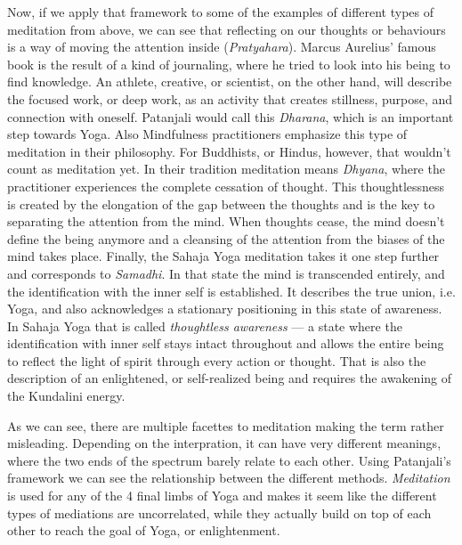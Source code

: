 \documentclass[12pt]{article}
\begin{document}
Now, if we apply that framework to some of the examples of different types of meditation from above, we can see that reflecting on our thoughts or behaviours is a way of moving the attention inside (\textit{Pratyahara}). Marcus Aurelius' famous book is the result of a kind of journaling, where he tried to look into his being to find knowledge.
An athlete, creative, or scientist, on the other hand, will describe the focused work, or deep work, as an activity that creates stillness, purpose, and connection with oneself.
Patanjali would call this \textit{Dharana}, which is an important step towards Yoga.
Also Mindfulness practitioners emphasize this type of meditation in their philosophy.
For Buddhists, or Hindus, however, that wouldn't count as meditation yet.
In their tradition meditation means \textit{Dhyana}, where the practitioner experiences the complete cessation of thought.
This thoughtlessness is created by the elongation of the gap between the thoughts and is the key to separating the attention from the mind.
When thoughts cease, the mind doesn't define the being anymore and a cleansing of the attention from the biases of the mind takes place.
Finally, the Sahaja Yoga meditation takes it one step further and corresponds to \textit{Samadhi}.
In that state the mind is transcended entirely, and the identification with the inner self is established.
It describes the true union, i.e. Yoga, and also acknowledges a stationary positioning in this state of awareness.
In Sahaja Yoga that is called \textit{thoughtless awareness} --- a state where the identification with inner self stays intact throughout and allows the entire being to reflect the light of spirit through every action or thought.
That is also the description of an enlightened, or self-realized being and requires the awakening of the Kundalini energy.

As we can see, there are multiple facettes to meditation making the term rather misleading.
Depending on the interpration, it can have very different meanings, where the two ends of the spectrum barely relate to each other.
Using Patanjali's framework we can see the relationship between the different methods.
\textit{Meditation} is used for any of the 4 final limbs of Yoga and makes it seem like the different types of mediations are uncorrelated, while they actually build on top of each other to reach the goal of Yoga, or enlightenment.
\end{document}
